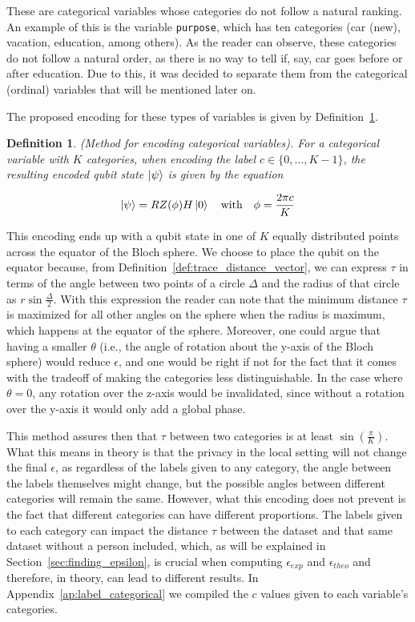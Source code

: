 \documentclass{ieeeaccess}
\newtheorem{definition}{Definition}[section]
\begin{document}
These are categorical variables whose categories do not follow a natural ranking. An example of this is the variable \texttt{purpose}, which has ten categories (car (new), vacation, education, among others). As the reader can observe, these categories do not follow a natural order, as there is no way to tell if, say, car goes before or after education. Due to this, it was decided to separate them from the categorical (ordinal) variables that will be mentioned later on.

The proposed encoding for these types of variables is given by Definition~\ref{def:encoding_categorical}.

\begin{definition}
  (Method for encoding categorical variables). For a categorical variable with $K$ categories, when encoding the label $c \in \{0, \dots, K - 1\}$, the resulting encoded qubit state $\ket{\psi}$ is given by the equation

  \[
    \ket{\psi} = RZ(\phi)H\ket{0} \quad \text{with} \quad \phi = \frac{2\pi c}{K}
  \]
  \label{def:encoding_categorical}
\end{definition}


This encoding ends up with a qubit state in one of $K$ equally distributed points across the equator of the Bloch sphere. We choose to place the qubit on the equator because, from Definition~\ref{def:trace_distance_vector}, we can express $\tau$ in terms of the angle between two points of a circle $\Delta$ and the radius of that circle as $r\sin{\frac{\Delta}{2}}$. With this expression the reader can note that the minimum distance $\tau$ is maximized for all other angles on the sphere when the radius is maximum, which happens at the equator of the sphere. Moreover, one could argue that having a smaller $\theta$ (i.e., the angle of rotation about the y-axis of the Bloch sphere) would reduce $\epsilon$, and one would be right if not for the fact that it comes with the tradeoff of making the categories less distinguishable. In the case where $\theta = 0$, any rotation over the z-axis would be invalidated, since without a rotation over the y-axis it would only add a global phase.

This method assures then that $\tau$ between two categories is at least $\sin(\frac{\pi}{K})$. What this means in theory is that the privacy in the local setting will not change the final $\epsilon$, as regardless of the labels given to any category, the angle between the labels themselves might change, but the possible angles between different categories will remain the same. However, what this encoding does not prevent is the fact that different categories can have different proportions. The labels given to each category can impact the distance $\tau$ between the dataset and that same dataset without a person included, which, as will be explained in Section~\ref{sec:finding_epsilon}, is crucial when computing $\epsilon_{exp}$ and $\epsilon_{theo}$ and therefore, in theory, can lead to different results. In Appendix~\ref{ap:label_categorical} we compiled the $c$ values given to each variable's categories.
\end{document}
